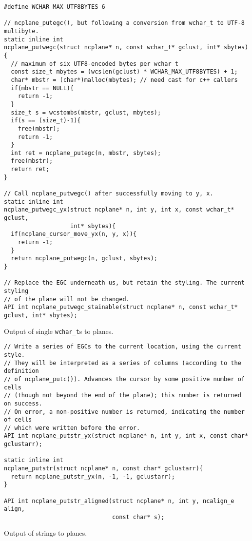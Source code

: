 \begin{listing}[!htbp]
\begin{verbatim}
#define WCHAR_MAX_UTF8BYTES 6

// ncplane_putegc(), but following a conversion from wchar_t to UTF-8 multibyte.
static inline int
ncplane_putwegc(struct ncplane* n, const wchar_t* gclust, int* sbytes){
  // maximum of six UTF8-encoded bytes per wchar_t
  const size_t mbytes = (wcslen(gclust) * WCHAR_MAX_UTF8BYTES) + 1;
  char* mbstr = (char*)malloc(mbytes); // need cast for c++ callers
  if(mbstr == NULL){
    return -1;
  }
  size_t s = wcstombs(mbstr, gclust, mbytes);
  if(s == (size_t)-1){
    free(mbstr);
    return -1;
  }
  int ret = ncplane_putegc(n, mbstr, sbytes);
  free(mbstr);
  return ret;
}

// Call ncplane_putwegc() after successfully moving to y, x.
static inline int
ncplane_putwegc_yx(struct ncplane* n, int y, int x, const wchar_t* gclust,
                   int* sbytes){
  if(ncplane_cursor_move_yx(n, y, x)){
    return -1;
  }
  return ncplane_putwegc(n, gclust, sbytes);
}

// Replace the EGC underneath us, but retain the styling. The current styling
// of the plane will not be changed.
API int ncplane_putwegc_stainable(struct ncplane* n, const wchar_t* gclust, int* sbytes);
\end{verbatim}
\caption{Output of single \texttt{wchar\_t}s to planes.}
\label{list:putc}
\end{listing}

\begin{listing}[!htbp]
\begin{verbatim}
// Write a series of EGCs to the current location, using the current style.
// They will be interpreted as a series of columns (according to the definition
// of ncplane_putc()). Advances the cursor by some positive number of cells
// (though not beyond the end of the plane); this number is returned on success.
// On error, a non-positive number is returned, indicating the number of cells
// which were written before the error.
API int ncplane_putstr_yx(struct ncplane* n, int y, int x, const char* gclustarr);

static inline int
ncplane_putstr(struct ncplane* n, const char* gclustarr){
  return ncplane_putstr_yx(n, -1, -1, gclustarr);
}

API int ncplane_putstr_aligned(struct ncplane* n, int y, ncalign_e align,
                               const char* s);
\end{verbatim}
\caption{Output of strings to planes.}
\label{list:putc}
\end{listing}

